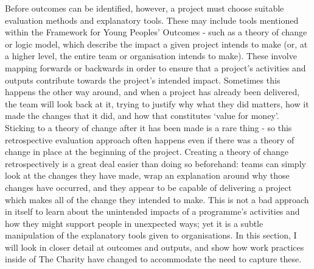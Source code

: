 Before outcomes can be identified, however, a project must choose suitable evaluation methods and explanatory tools. These may include tools mentioned within the Framework for Young Peoples' Outcomes - such as a theory of change or logic model, which describe the impact a given project intends to make (or, at a higher level, the entire team or organisation intends to make). These involve mapping forwards or backwards in order to ensure that a project's activities and outputs contribute towards the project's intended impact. Sometimes this happens the other way around, and when a project has already been delivered, the team will look back at it, trying to justify why what they did matters, how it made the changes that it did, and how that constitutes `value for money'. Sticking to a theory of change after it has been made is a rare thing - so this retrospective evaluation approach often happens even if there was a theory of change in place at the beginning of the project. Creating a theory of change retrospectively is a great deal easier than doing so beforehand: teams can simply look at the changes they have made, wrap an explanation around why those changes have occurred, and they appear to be capable of delivering a project which makes all of the change they intended to make. This is not a bad approach in itself to learn about the unintended impacts of a programme's activities and how they might support people in unexpected ways; yet it is a subtle manipulation of the explanatory tools given to organisations. In this section, I will look in closer detail at outcomes and outputs, and show how work practices inside of The Charity have changed to accommodate the need to capture these.

